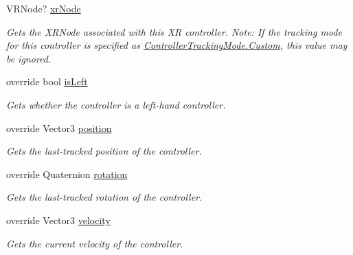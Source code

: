 \begin{DoxyCompactItemize}
V\+R\+Node? \mbox{\hyperlink{class_leap_1_1_unity_1_1_interaction_1_1_interaction_x_r_controller_a11711962768f6818de5fb89cbbaeea65}{xr\+Node}}
\begin{DoxyCompactList}\small\item\em Gets the X\+R\+Node associated with this XR controller. Note\+: If the tracking mode for this controller is specified as \mbox{\hyperlink{namespace_leap_1_1_unity_1_1_interaction_ab4a739b7f8a6748903e2ccc029df7a50a90589c47f06eb971d548591f23c285af}{Controller\+Tracking\+Mode.\+Custom}}, this value may be ignored. \end{DoxyCompactList}\item 
override bool \mbox{\hyperlink{class_leap_1_1_unity_1_1_interaction_1_1_interaction_x_r_controller_aa97e1a14b291fe8057eed37d09aa586d}{is\+Left}}
\begin{DoxyCompactList}\small\item\em Gets whether the controller is a left-\/hand controller. \end{DoxyCompactList}\item 
override Vector3 \mbox{\hyperlink{class_leap_1_1_unity_1_1_interaction_1_1_interaction_x_r_controller_aaaa34551dbab0d0a98f1ab22f85adaa6}{position}}
\begin{DoxyCompactList}\small\item\em Gets the last-\/tracked position of the controller. \end{DoxyCompactList}\item 
override Quaternion \mbox{\hyperlink{class_leap_1_1_unity_1_1_interaction_1_1_interaction_x_r_controller_ac6a09708dffecce4b8ef9e4e88097328}{rotation}}
\begin{DoxyCompactList}\small\item\em Gets the last-\/tracked rotation of the controller. \end{DoxyCompactList}\item 
override Vector3 \mbox{\hyperlink{class_leap_1_1_unity_1_1_interaction_1_1_interaction_x_r_controller_ae21cfe425c83f331f03044e9132674f7}{velocity}}
\begin{DoxyCompactList}\small\item\em Gets the current velocity of the controller. \end{DoxyCompactList}\item 

\end{DoxyCompactItemize}
